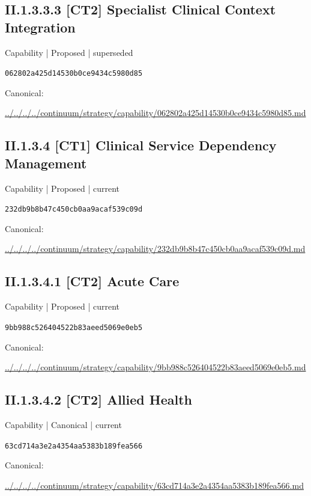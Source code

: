 \documentclass[10pt,a4paper]{article}
\begin{document}
\subsection*{II.1.3.3.3 [CT2] Specialist Clinical Context Integration}
{\small Capability | Proposed | superseded}\par
\texttt{062802a425d14530b0ce9434c5980d85}\par
Canonical: \par
{\footnotesize\url{../../../../continuum/strategy/capability/062802a425d14530b0ce9434c5980d85.md}}\par
\subsection*{II.1.3.4 [CT1] Clinical Service Dependency Management}
{\small Capability | Proposed | current}\par
\texttt{232db9b8b47c450cb0aa9acaf539c09d}\par
Canonical: \par
{\footnotesize\url{../../../../continuum/strategy/capability/232db9b8b47c450cb0aa9acaf539c09d.md}}\par
\subsection*{II.1.3.4.1 [CT2] Acute Care}
{\small Capability | Proposed | current}\par
\texttt{9bb988c526404522b83aeed5069e0eb5}\par
Canonical: \par
{\footnotesize\url{../../../../continuum/strategy/capability/9bb988c526404522b83aeed5069e0eb5.md}}\par
\subsection*{II.1.3.4.2 [CT2] Allied Health}
{\small Capability | Canonical | current}\par
\texttt{63cd714a3e2a4354aa5383b189fea566}\par
Canonical: \par
{\footnotesize\url{../../../../continuum/strategy/capability/63cd714a3e2a4354aa5383b189fea566.md}}\par
\end{document}
